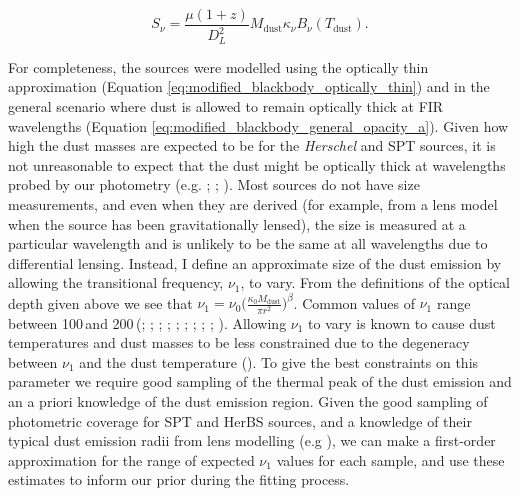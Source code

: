 \begin{equation}
	S_\nu = \frac{\mu (1+z)}{D_L^2}M_{\textrm{dust}}\kappa_\nu B_\nu(T_{\textrm{dust}}).
	\label{eq:modified_blackbody_optically_thin}
\end{equation}

For completeness, the sources were modelled using the optically thin approximation (Equation \ref{eq:modified_blackbody_optically_thin}) and in the general scenario where dust is allowed to remain optically thick at FIR wavelengths (Equation \ref{eq:modified_blackbody_general_opacity_a}). Given how high the dust masses are expected to be for the \textit{Herschel} and SPT sources, it is not unreasonable to expect that the dust might be optically thick at wavelengths probed by our photometry (e.g. \citealt{Conley_2011}; \citealt{Casey_2019}; \citealt{Cortzen_2020}). Most sources do not have size measurements, and even when they are derived (for example, from a lens model when the source has been gravitationally lensed), the size is measured at a particular wavelength and is unlikely to be the same at all wavelengths due to differential lensing.  Instead, I define an approximate size of the dust emission by allowing the transitional frequency, $\nu_1$, to vary. From the definitions of the optical depth given above we see that $\nu_1 = \nu_0\Big(\frac{\kappa_0 M_{\textrm{dust}}}{\pi r^2}\Big)^\beta$. Common values of $\nu_1$ range between 100\,\micron and 200\,\micron (\citealt{Blain_2003}; \citealt{Draine_2006}; \citealt{Conley_2011}; \citealt{Rangwala_2011}; \citealt{Greve_2012}; \citealt{Casey_2014}; \citealt{Spilker_2016}; \citealt{Casey_2019}; \citealt{Cooper_2022}; \citealt{Drew_2022}). Allowing $\nu_1$ to vary is known to cause dust temperatures and dust masses to be less constrained due to the degeneracy between $\nu_1$ and the dust temperature (\citealt{daCunha_2021}). To give the best constraints on this parameter we require good sampling of the thermal peak of the dust emission and an a priori knowledge of the dust emission region. Given the good sampling of photometric coverage for SPT and HerBS sources, and a knowledge of their typical dust emission radii from lens modelling (e.g \citealt{Spilker_2016}), we can make a first-order approximation for the range of expected $\nu_1$ values for each sample, and use these estimates to inform our prior during the fitting process.

